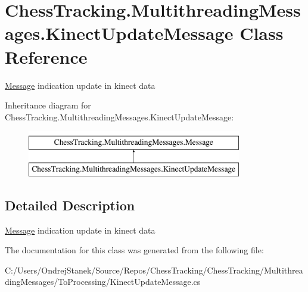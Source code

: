 \hypertarget{class_chess_tracking_1_1_multithreading_messages_1_1_kinect_update_message}{}\section{Chess\+Tracking.\+Multithreading\+Messages.\+Kinect\+Update\+Message Class Reference}
\label{class_chess_tracking_1_1_multithreading_messages_1_1_kinect_update_message}


\mbox{\hyperlink{class_chess_tracking_1_1_multithreading_messages_1_1_message}{Message}} indication update in kinect data  


Inheritance diagram for Chess\+Tracking.\+Multithreading\+Messages.\+Kinect\+Update\+Message\+:\begin{figure}[H]
\begin{center}
\leavevmode
\includegraphics[height=2.000000cm]{class_chess_tracking_1_1_multithreading_messages_1_1_kinect_update_message}
\end{center}
\end{figure}


\subsection{Detailed Description}
\mbox{\hyperlink{class_chess_tracking_1_1_multithreading_messages_1_1_message}{Message}} indication update in kinect data 



The documentation for this class was generated from the following file\+:\begin{DoxyCompactItemize}
\item 
C\+:/\+Users/\+Ondrej\+Stanek/\+Source/\+Repos/\+Chess\+Tracking/\+Chess\+Tracking/\+Multithreading\+Messages/\+To\+Processing/Kinect\+Update\+Message.\+cs\end{DoxyCompactItemize}
